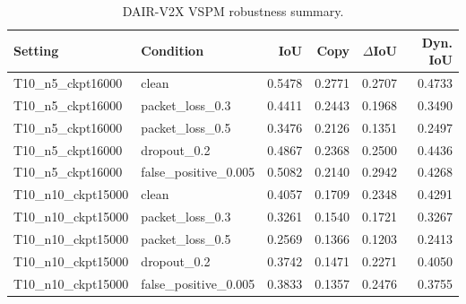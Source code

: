 \begin{table}[t]
\centering
\caption{DAIR-V2X VSPM robustness summary.}
\label{tab:dair-vspm-robustness}
\begin{tabular}{llrrrr}
\toprule
Setting & Condition & IoU & Copy & $\Delta$IoU & Dyn. IoU \\
\midrule
T10\_n5\_ckpt16000 & clean & 0.5478 & 0.2771 & 0.2707 & 0.4733 \\
T10\_n5\_ckpt16000 & packet\_loss\_0.3 & 0.4411 & 0.2443 & 0.1968 & 0.3490 \\
T10\_n5\_ckpt16000 & packet\_loss\_0.5 & 0.3476 & 0.2126 & 0.1351 & 0.2497 \\
T10\_n5\_ckpt16000 & dropout\_0.2 & 0.4867 & 0.2368 & 0.2500 & 0.4436 \\
T10\_n5\_ckpt16000 & false\_positive\_0.005 & 0.5082 & 0.2140 & 0.2942 & 0.4268 \\
T10\_n10\_ckpt15000 & clean & 0.4057 & 0.1709 & 0.2348 & 0.4291 \\
T10\_n10\_ckpt15000 & packet\_loss\_0.3 & 0.3261 & 0.1540 & 0.1721 & 0.3267 \\
T10\_n10\_ckpt15000 & packet\_loss\_0.5 & 0.2569 & 0.1366 & 0.1203 & 0.2413 \\
T10\_n10\_ckpt15000 & dropout\_0.2 & 0.3742 & 0.1471 & 0.2271 & 0.4050 \\
T10\_n10\_ckpt15000 & false\_positive\_0.005 & 0.3833 & 0.1357 & 0.2476 & 0.3755 \\
\bottomrule
\end{tabular}
\end{table}
